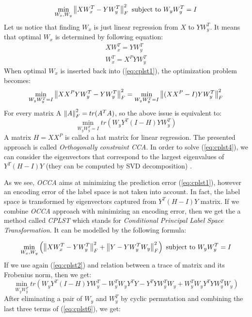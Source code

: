 \begin{equation}\label{eq:cplst1}
    \min_{W_x, W_y} \left\lVert XW_x^T-YW_y^T\right\rVert_{F}^2  
    \text{  subject to   } W_yW_y^T=I   
\end{equation}
Let us notice that finding $W_x$ is just linear regression from $X$ to $YW_y^T$. It means that optimal $W_x$ is determined by following equation:
\begin{equation}\label{eq:cplst2}
\begin{split}
    XW_x^T=YW_y^T \\
    W_x^T=X^PYW_y^T
\end{split}
\end{equation}
When optimal $W_x$ is inserted back into (\ref{eq:cplst1}), the optimization problem becomes:
\begin{equation}\label{eq:cplst3}
    \min_{W_yW_y^T=I} \left\lVert XX^PYW_y^T-YW_y^T\right\rVert_{F}^2=\min_{W_yW_y^T=I} \left\lVert(XX^P-I)YW_y^T\right\rVert_{F}^2
\end{equation}
For every matrix A $\left\lVert A\right\rVert_{F}^2=tr(A^TA)$, so the above issue is equivalent to:
\begin{equation}\label{eq:cplst4}
    \min_{W_yW_y^T=I} tr(W_yY^T(I-H)YW_y^T)
\end{equation}
A matrix $H=XX^P$ is called a hat matrix for linear regression. The presented approach is called \textit{Orthogonally constraint CCA}. In order to solve (\ref{eq:cplst4}), we can consider the eigenvectors that correspond to the largest eigenvalues of $Y^T(H-I)Y$ (they can be computed by SVD decomposition) \cite{ChenLin}.

As we see, \textit{OCCA} aims at minimizing the prediction error (\ref{eq:cplst1}), however an encoding error of the label space is not taken into account. In fact, the label space is transformed by eigenvectors captured from $Y^T(H-I)Y$ matrix. If we combine \textit{OCCA} approach with minimizing an encoding error, then we get the a method called \textit{CPLST} which stands for \textit{Conditional Principal Label Space Transformation}. It can be modelled by the following formula:

\begin{equation}\label{eq:cplst5}
    \min_{W_x, W_y} \left(\left\lVert XW_x^T-YW_y^T\right\rVert_{F}^2 + \left\lVert Y-YW_y^TW_y\right\rVert_{F}^2\right)  
    \text{  subject to   } W_yW_y^T=I   
\end{equation}
If we use again (\ref{eq:cplst2}) and relation between a trace of matrix and its Frobenius norm, then we get:
\begin{equation}\label{eq:cplst6}
    \min_{W_yW_y^T} tr(W_yY^T(I-H)YW_y^T-W_y^TW_yY^TY-Y^TYW_y^TW_y+W_y^TW_yY^TYW_y^TW_y)  
\end{equation}
After eliminating a pair of $W_y$ and $W_y^T$ by cyclic permutation and combining the last three terms of (\ref{eq:cplst6}), we get:

